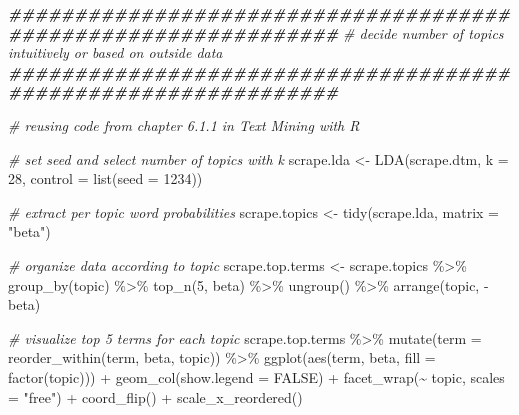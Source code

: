 \documentclass[
]{article}
\newenvironment{Shaded}{\begin{snugshade}}{\end{snugshade}}
\newcommand{\AttributeTok}[1]{\textcolor[rgb]{0.77,0.63,0.00}{#1}}
\newcommand{\CommentTok}[1]{\textcolor[rgb]{0.56,0.35,0.01}{\textit{#1}}}
\newcommand{\ConstantTok}[1]{\textcolor[rgb]{0.00,0.00,0.00}{#1}}
\newcommand{\DecValTok}[1]{\textcolor[rgb]{0.00,0.00,0.81}{#1}}
\newcommand{\DocumentationTok}[1]{\textcolor[rgb]{0.56,0.35,0.01}{\textbf{\textit{#1}}}}
\newcommand{\FunctionTok}[1]{\textcolor[rgb]{0.00,0.00,0.00}{#1}}
\newcommand{\NormalTok}[1]{#1}
\newcommand{\OtherTok}[1]{\textcolor[rgb]{0.56,0.35,0.01}{#1}}
\newcommand{\SpecialCharTok}[1]{\textcolor[rgb]{0.00,0.00,0.00}{#1}}
\newcommand{\StringTok}[1]{\textcolor[rgb]{0.31,0.60,0.02}{#1}}
\begin{document}
\begin{Shaded}
\begin{Highlighting}[]
\DocumentationTok{\#\#\#\#\#\#\#\#\#\#\#\#\#\#\#\#\#\#\#\#\#\#\#\#\#\#\#\#\#\#\#\#\#\#\#\#\#\#\#\#\#\#\#\#\#\#\#\#\#\#\#\#\#\#\#\#\#\#\#\#\#\#\#}
\CommentTok{\# decide number of topics intuitively or based on outside data}
\DocumentationTok{\#\#\#\#\#\#\#\#\#\#\#\#\#\#\#\#\#\#\#\#\#\#\#\#\#\#\#\#\#\#\#\#\#\#\#\#\#\#\#\#\#\#\#\#\#\#\#\#\#\#\#\#\#\#\#\#\#\#\#\#\#\#\#}

\CommentTok{\# reusing code from chapter 6.1.1 in Text Mining with R}

\CommentTok{\# set seed and select number of topics with \textquotesingle{}k\textquotesingle{}}
\NormalTok{scrape.lda }\OtherTok{\textless{}{-}} \FunctionTok{LDA}\NormalTok{(scrape.dtm, }\AttributeTok{k =} \DecValTok{28}\NormalTok{, }\AttributeTok{control =} \FunctionTok{list}\NormalTok{(}\AttributeTok{seed =} \DecValTok{1234}\NormalTok{))}

\CommentTok{\# extract per topic word probabilities}
\NormalTok{scrape.topics }\OtherTok{\textless{}{-}} \FunctionTok{tidy}\NormalTok{(scrape.lda, }\AttributeTok{matrix =} \StringTok{"beta"}\NormalTok{)}

\CommentTok{\# organize data according to \textquotesingle{}topic\textquotesingle{}}
\NormalTok{scrape.top.terms }\OtherTok{\textless{}{-}}\NormalTok{ scrape.topics }\SpecialCharTok{\%\textgreater{}\%}
  \FunctionTok{group\_by}\NormalTok{(topic) }\SpecialCharTok{\%\textgreater{}\%}
  \FunctionTok{top\_n}\NormalTok{(}\DecValTok{5}\NormalTok{, beta) }\SpecialCharTok{\%\textgreater{}\%}
  \FunctionTok{ungroup}\NormalTok{() }\SpecialCharTok{\%\textgreater{}\%}
  \FunctionTok{arrange}\NormalTok{(topic, }\SpecialCharTok{{-}}\NormalTok{beta)}

\CommentTok{\# visualize top 5 terms for each topic}
\NormalTok{scrape.top.terms }\SpecialCharTok{\%\textgreater{}\%}
  \FunctionTok{mutate}\NormalTok{(}\AttributeTok{term =} \FunctionTok{reorder\_within}\NormalTok{(term, beta, topic)) }\SpecialCharTok{\%\textgreater{}\%}
  \FunctionTok{ggplot}\NormalTok{(}\FunctionTok{aes}\NormalTok{(term, beta, }\AttributeTok{fill =} \FunctionTok{factor}\NormalTok{(topic))) }\SpecialCharTok{+}
  \FunctionTok{geom\_col}\NormalTok{(}\AttributeTok{show.legend =} \ConstantTok{FALSE}\NormalTok{) }\SpecialCharTok{+}
  \FunctionTok{facet\_wrap}\NormalTok{(}\SpecialCharTok{\textasciitilde{}}\NormalTok{ topic, }\AttributeTok{scales =} \StringTok{"free"}\NormalTok{) }\SpecialCharTok{+}
  \FunctionTok{coord\_flip}\NormalTok{() }\SpecialCharTok{+}
  \FunctionTok{scale\_x\_reordered}\NormalTok{()}
\end{Highlighting}
\end{Shaded}
\end{document}

